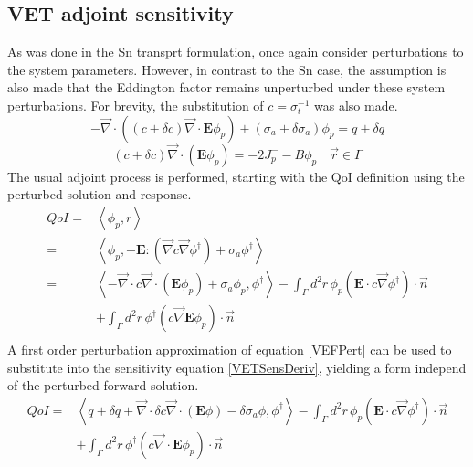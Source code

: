 \documentclass{article}
\newcommand{\vr}{\vec{r}}
\newcommand{\bra}{\left\langle}
\newcommand{\ket}{\right\rangle}
\newcommand{\vdiv}{\vec{\nabla} \cdot}
\newcommand{\vgrad}{\vec{\nabla}}
\newcommand{\Edd}{\mathbf{E}}
\newcommand{\sigt}{\sigma_t}
\newcommand{\siga}{\sigma_a}
\newcommand{\isigt}{c}
\newcommand{\scalSource}{q}
\newcommand{\scalResp}{r}
\newcommand{\qoi}{QoI}
\begin{document}
\subsection{VET adjoint sensitivity}
As was done in the Sn transprt formulation, once again consider perturbations to the system parameters. However, in contrast to the Sn case, the assumption is also made that the Eddington factor remains unperturbed under these system perturbations. For brevity, the substitution of $\isigt = \sigt^{-1}$ was also made.
\begin{equation}
\label{VEFPert}
- \vdiv \left((\isigt + \delta \isigt)\vdiv \Edd \phi_p \right) + (\siga + \delta \siga)\phi_p = \scalSource + \delta \scalSource
\end{equation}
\begin{equation}
(\isigt + \delta \isigt) \vec{\nabla} \cdot \left(\Edd \phi_p \right)  = - 2J_p^- - B \phi_p \quad \vr \in \Gamma
\end{equation}
The usual adjoint process is performed, starting with the QoI definition using the perturbed solution and response. 
\begin{equation}
\label{VETSensDeriv}
\begin{split}
\qoi=&\bra \phi_p , \scalResp \ket \\
=&\bra \phi_p , - \Edd : \left( \vgrad \isigt \vgrad \phi^\dag \right) + \siga \phi^\dag \ket \\
=& \bra - \vdiv \isigt \vdiv \left( \Edd \phi_p \right) + \siga \phi_p, \phi^\dag \ket 
- \int_\Gamma d^2 r \, \phi_p \left( \Edd \cdot \isigt \vgrad \phi^\dag \right) \cdot \vec{n}  \\ 
&+ \int_\Gamma d^2 r \, \phi^\dag \left(  \isigt \vgrad \Edd \phi_p \right) \cdot \vec{n} \\
\end{split}
\end{equation}
A first order perturbation approximation of equation \ref{VEFPert} can be used to substitute into the sensitivity equation \ref{VETSensDeriv}, yielding a form independ of the perturbed forward solution.
\begin{equation}
\label{QoIVETAdjNoBC}
\begin{split}
\qoi =& \bra \scalSource + \delta \scalSource + \vdiv \delta \isigt \vdiv \left( \Edd \phi \right) - \delta \siga \phi, \phi^\dag \ket - \int_\Gamma d^2 r \, \phi_p \left( \Edd \cdot \isigt \vgrad \phi^\dag \right) \cdot \vec{n} 
\\ &+ \int_\Gamma d^2 r \, \phi^\dag \left(  \isigt \vdiv \Edd \phi_p \right) \cdot \vec{n} 
\end{split}
\end{equation}
\end{document}
